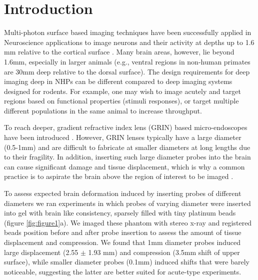 \documentclass[10pt]{article}
\begin{document}
\section{Introduction}

Multi-photon surface based imaging techniques have been successfully applied in Neuroscience applications to image neurons and their activity at depths up to 1.6 mm relative to the cortical surface \cite{Horton2013-ce,Ouzounov2017-tg}. Many brain areas, however, lie beyond 1.6mm, especially in larger animals (e.g., ventral regions in non-human primates are 30mm deep relative to the dorsal surface).  The design requirements for deep imaging deep in NHPs can be different compared to deep imaging systems designed for rodents. For example, one may wish to image acutely and target regions based on functional properties (stimuli responses), or target multiple different populations in the same animal to increase throughput.  

To reach deeper, gradient refractive index lens (GRIN) based micro-endoscopes have been introduced \cite{Bocarsly2015-sa, Szabo2014-op,Mekhail2016-oi,Ghosh2011-mt}. However, GRIN lenses typically have a large diameter (0.5-1mm) and are difficult to fabricate at smaller diameters at long lengths due to their fragility. In addition, inserting such large diameter probes into the brain can cause significant damage and tissue displacement, which is why a common practice is to aspirate the brain above the region of interest to be imaged \cite{Barretto2012-kw}. 

To assess expected brain deformation induced by inserting probes of different diameters we ran experiments in which probes of varying diameter were inserted into gel with brain like consistency, sparsely filled with tiny platinum beads (figure \ref{fig:figure1}a). We imaged these phantom with stereo x-ray and registered beads position before and after probe insertion to assess the amount of tissue displacement and compression. We found that 1mm diameter probes induced large displacement (2.55 $\pm$ 1.93 mm) and compression (3.5mm shift of upper surface), while smaller diameter probes (0.1mm) induced shifts that were barely noticeable, suggesting the latter are better suited for acute-type experiments.  
\end{document}
